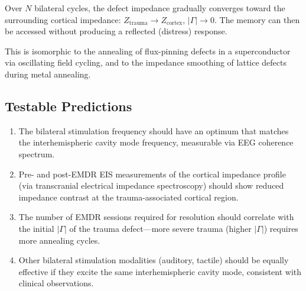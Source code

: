 Over $N$ bilateral cycles, the defect impedance gradually
converges toward the surrounding cortical impedance:
$Z_{\mathrm{trauma}} \to Z_{\mathrm{cortex}}$,
$|\Gamma| \to 0$.  The memory can then be accessed without
producing a reflected (distress) response.

This is isomorphic to the annealing of flux-pinning defects in
a superconductor via oscillating field cycling, and to the
impedance smoothing of lattice defects during metal annealing.

\subsection{Testable Predictions}

\begin{enumerate}
  \item The bilateral stimulation frequency should have an optimum
        that matches the interhemispheric cavity mode frequency,
        measurable via EEG coherence spectrum.
  \item Pre- and post-EMDR EIS measurements of the cortical
        impedance profile (via transcranial electrical impedance
        spectroscopy) should show reduced impedance contrast at
        the trauma-associated cortical region.
  \item The number of EMDR sessions required for resolution should
        correlate with the initial $|\Gamma|$ of the trauma
        defect---more severe trauma (higher $|\Gamma|$) requires
        more annealing cycles.
  \item Other bilateral stimulation modalities (auditory, tactile)
        should be equally effective if they excite the same
        interhemispheric cavity mode, consistent with clinical
        observations.
\end{enumerate}
